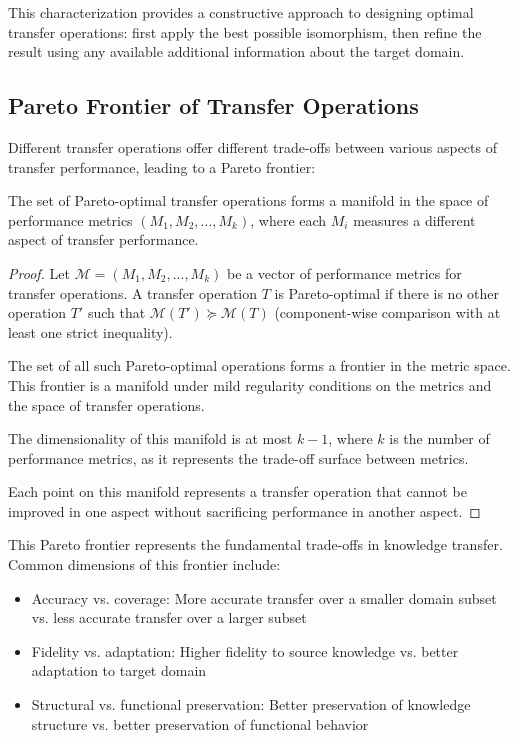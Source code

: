 This characterization provides a constructive approach to designing optimal transfer operations: first apply the best possible isomorphism, then refine the result using any available additional information about the target domain.

\subsection{Pareto Frontier of Transfer Operations}

Different transfer operations offer different trade-offs between various aspects of transfer performance, leading to a Pareto frontier:

\begin{theorem}
The set of Pareto-optimal transfer operations forms a manifold in the space of performance metrics $(M_1, M_2, ..., M_k)$, where each $M_i$ measures a different aspect of transfer performance.
\end{theorem}

\begin{proof}
Let $\mathcal{M} = (M_1, M_2, ..., M_k)$ be a vector of performance metrics for transfer operations. A transfer operation $T$ is Pareto-optimal if there is no other operation $T'$ such that $\mathcal{M}(T') \succeq \mathcal{M}(T)$ (component-wise comparison with at least one strict inequality).

The set of all such Pareto-optimal operations forms a frontier in the metric space. This frontier is a manifold under mild regularity conditions on the metrics and the space of transfer operations.

The dimensionality of this manifold is at most $k-1$, where $k$ is the number of performance metrics, as it represents the trade-off surface between metrics.

Each point on this manifold represents a transfer operation that cannot be improved in one aspect without sacrificing performance in another aspect.
\end{proof}

This Pareto frontier represents the fundamental trade-offs in knowledge transfer. Common dimensions of this frontier include:
\begin{itemize}
    \item Accuracy vs. coverage: More accurate transfer over a smaller domain subset vs. less accurate transfer over a larger subset
    \item Fidelity vs. adaptation: Higher fidelity to source knowledge vs. better adaptation to target domain
    \item Structural vs. functional preservation: Better preservation of knowledge structure vs. better preservation of functional behavior
\end{itemize}


